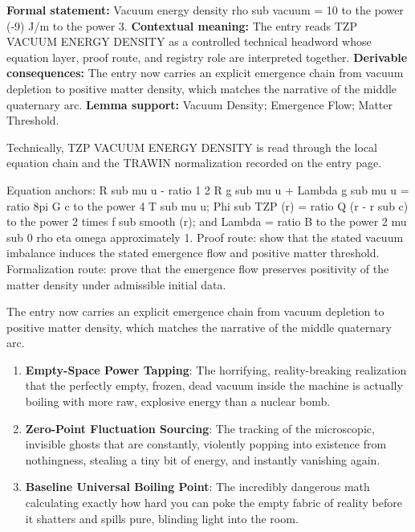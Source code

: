 \begingroup\footnotesize\setlength{\emergencystretch}{3em}\sloppy
\textbf{Formal statement:} Vacuum energy density rho sub vacuum = 10 to the power (-9) J/m to the power 3. \textbf{Contextual meaning:} The entry reads TZP VACUUM ENERGY DENSITY as a controlled technical headword whose equation layer, proof route, and registry role are interpreted together. \textbf{Derivable consequences:} The entry now carries an explicit emergence chain from vacuum depletion to positive matter density, which matches the narrative of the middle quaternary arc. \textbf{Lemma support:} Vacuum Density; Emergence Flow; Matter Threshold.\par
\endgroup

Technically, TZP VACUUM ENERGY DENSITY is read through the local equation chain and the TRAWIN normalization recorded on the entry page.

Equation anchors: R sub mu u - ratio 1 2 R g sub mu u + Lambda g sub mu u = ratio 8pi G c to the power 4 T sub mu u; Phi sub TZP (r) = ratio Q (r - r sub c) to the power 2 times f sub smooth (r); and Lambda = ratio B to the power 2 mu sub 0 rho eta omega approximately 1. Proof route: show that the stated vacuum imbalance induces the stated emergence flow and positive matter threshold. Formalization route: prove that the emergence flow preserves positivity of the matter density under admissible initial data.

The entry now carries an explicit emergence chain from vacuum depletion to positive matter density, which matches the narrative of the middle quaternary arc.
\endgroup

\begin{enumerate}[leftmargin=1.6em,itemsep=6pt,topsep=4pt]
\item \textbf{Empty-Space Power Tapping}: The horrifying, reality-breaking realization that the perfectly empty, frozen, dead vacuum inside the machine is actually boiling with more raw, explosive energy than a nuclear bomb.
\item \textbf{Zero-Point Fluctuation Sourcing}: The tracking of the microscopic, invisible ghosts that are constantly, violently popping into existence from nothingness, stealing a tiny bit of energy, and instantly vanishing again.
\item \textbf{Baseline Universal Boiling Point}: The incredibly dangerous math calculating exactly how hard you can poke the empty fabric of reality before it shatters and spills pure, blinding light into the room.
\end{enumerate}

